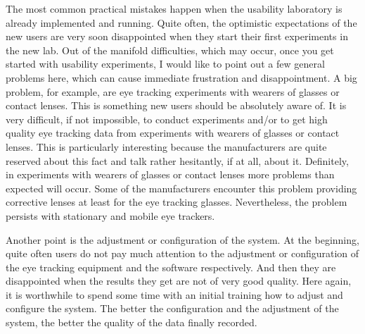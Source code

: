 \documentclass[output=paper]{langsci/langscibook}
\begin{document}
The most common practical mistakes happen when the usability laboratory is already implemented and running. Quite often, the optimistic expectations of the new users are very soon disappointed when they start their first experiments in the new lab. Out of the manifold difficulties, which may occur, once you get started with usability experiments, I would like to point out a few general problems here, which can cause immediate frustration and disappointment. A big problem, for example, are eye tracking experiments with wearers of glasses or contact lenses. This is something new users should be absolutely aware of. It is very difficult, if not impossible, to conduct experiments and/or to get high quality eye tracking data from experiments with wearers of glasses or contact lenses. This is particularly interesting because the manufacturers are quite reserved about this fact and talk rather hesitantly, if at all, about it. Definitely, in experiments with wearers of glasses or contact lenses more problems than expected will occur. Some of the manufacturers encounter this problem providing corrective lenses at least for the eye tracking glasses. Nevertheless, the problem persists with stationary and mobile eye trackers.



Another point is the adjustment or configuration of the system. At the beginning, quite often users do not pay much attention to the adjustment or configuration of the eye tracking equipment and the software respectively. And then they are disappointed when the results they get are not of very good quality. Here again, it is worthwhile to spend some time with an initial training how to adjust and configure the system. The better the configuration and the adjustment of the system, the better the quality of the data finally recorded.
\end{document}
